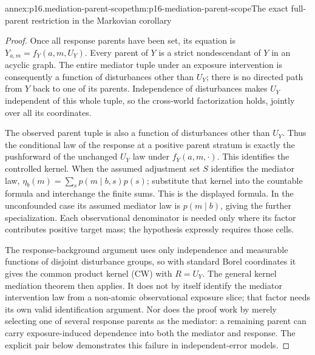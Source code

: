 \begin{annexitem}{annex:p16.mediation-parent-scope}{thm:p16-mediation-parent-scope}{The exact full-parent restriction in the Markovian corollary}
\begin{proof}
Once all response parents have been set, its equation is
\(Y_{a,m}=f_Y(a,m,U_Y)\). Every parent of \(Y\) is a strict
nondescendant of \(Y\) in an acyclic graph. The entire mediator tuple
under an exposure intervention is consequently a function of
disturbances other than \(U_Y\); there is no directed path from
\(Y\) back to one of its parents. Independence of disturbances makes
\(U_Y\) independent of this whole tuple, so the cross-world
factorization holds, jointly over all its coordinates.

The observed parent tuple is also a function of disturbances other than
\(U_Y\). Thus the conditional law of the response at a positive parent
stratum is exactly the pushforward of the unchanged \(U_Y\) law under
\(f_Y(a,m,\cdot)\). This identifies the controlled kernel. When the
assumed adjustment set \(S\) identifies the mediator law,
\(\eta_b(m)=\sum_s p(m\mid b,s)p(s)\); substitute that kernel into
the countable formula and interchange the finite sums. This is the
displayed formula. In the unconfounded case its assumed mediator law
is \(p(m\mid b)\), giving the further specialization. Each
observational denominator is needed only where its factor contributes
positive target mass; the hypothesis expressly requires those cells.

The response-background argument uses only independence and measurable
functions of disjoint disturbance groups, so with standard Borel
coordinates it gives the common product kernel (CW) with \(R=U_Y\).
The general kernel mediation theorem then applies. It does not by itself
identify the mediator intervention law from a non-atomic observational
exposure slice; that factor needs its own valid identification argument.
Nor does the proof work by merely selecting one of several response
parents as the mediator: a remaining parent can carry exposure-induced
dependence into both the mediator and response. The explicit pair below
demonstrates this failure in independent-error models.
\end{proof}
\end{annexitem}

